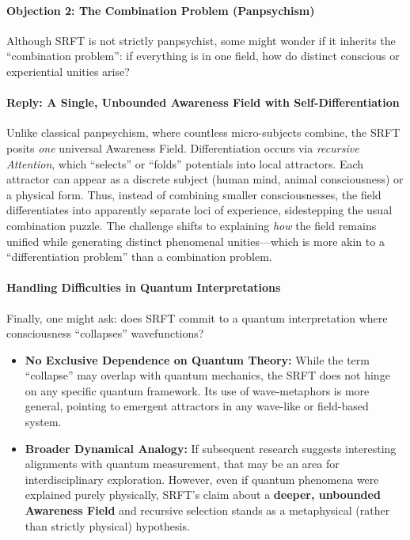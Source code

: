 \documentclass[12pt,a4paper]{article}
\begin{document}
\paragraph{Objection 2: The Combination Problem (Panpsychism)}
Although SRFT is not strictly panpsychist, some might wonder if it inherits the “combination problem”: if everything is in one field, how do distinct conscious or experiential unities arise?

\paragraph{Reply: A Single, Unbounded Awareness Field with Self-Differentiation}
Unlike classical panpsychism, where countless micro-subjects combine, the SRFT posits \emph{one} universal Awareness Field. Differentiation occurs via \emph{recursive Attention}, which “selects” or “folds” potentials into local attractors. Each attractor can appear as a discrete subject (human mind, animal consciousness) or a physical form. Thus, instead of combining smaller consciousnesses, the field differentiates into apparently separate loci of experience, sidestepping the usual combination puzzle. The challenge shifts to explaining \emph{how} the field remains unified while generating distinct phenomenal unities—which is more akin to a “differentiation problem” than a combination problem.

\paragraph{Handling Difficulties in Quantum Interpretations}
Finally, one might ask: does SRFT commit to a quantum interpretation where consciousness “collapses” wavefunctions?

\begin{itemize}
    \item \textbf{No Exclusive Dependence on Quantum Theory:}
    While the term “collapse” may overlap with quantum mechanics, the SRFT does not hinge on any specific quantum framework. Its use of wave-metaphors is more general, pointing to emergent attractors in any wave-like or field-based system.

    \item \textbf{Broader Dynamical Analogy:}
    If subsequent research suggests interesting alignments with quantum measurement, that may be an area for interdisciplinary exploration. However, even if quantum phenomena were explained purely physically, SRFT’s claim about a \textbf{deeper, unbounded Awareness Field} and recursive selection stands as a metaphysical (rather than strictly physical) hypothesis.
\end{itemize}
\end{document}
